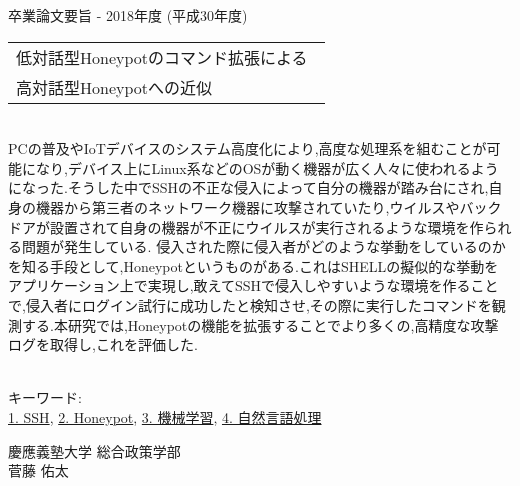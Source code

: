 卒業論文要旨 - 2018年度 (平成30年度)
\begin{center}
\begin{large}
\begin{tabular}{|M{0.97\linewidth}|}
    \hline
   低対話型Honeypotのコマンド拡張による\\高対話型Honeypotへの近似\\
    \hline
\end{tabular}
\end{large}
\end{center}

~ \\

PCの普及やIoTデバイスのシステム高度化により,高度な処理系を組むことが可能になり,デバイス上にLinux系などのOSが動く機器が広く人々に使われるようになった.そうした中でSSHの不正な侵入によって自分の機器が踏み台にされ,自身の機器から第三者のネットワーク機器に攻撃されていたり,ウイルスやバックドアが設置されて自身の機器が不正にウイルスが実行されるような環境を作られる問題が発生している.
侵入された際に侵入者がどのような挙動をしているのかを知る手段として,Honeypotというものがある.これはSHELLの擬似的な挙動をアプリケーション上で実現し,敢えてSSHで侵入しやすいような環境を作ることで,侵入者にログイン試行に成功したと検知させ,その際に実行したコマンドを観測する.本研究では,Honeypotの機能を拡張することでより多くの,高精度な攻撃ログを取得し,これを評価した.


~ \\
キーワード:\\
\underline{1. SSH},
\underline{2. Honeypot},
\underline{3. 機械学習},
\underline{4. 自然言語処理}
\begin{flushright}
慶應義塾大学 総合政策学部\\
菅藤 佑太
\end{flushright}
